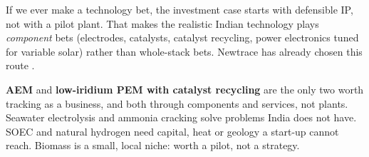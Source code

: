 \begin{finding}
If we ever make a technology bet, the investment case starts with defensible IP, not with a pilot plant. That makes the realistic Indian technology plays \emph{component} bets (electrodes, catalysts, catalyst recycling, power electronics tuned for variable solar) rather than whole-stack bets. Newtrace has already chosen this route \cite{newtrace2026}. \confM
\end{finding}

\begin{verdict}
\textbf{AEM} and \textbf{low-iridium PEM with catalyst recycling} are the only two worth tracking as a business, and both through components and services, not plants. Seawater electrolysis and ammonia cracking solve problems India does not have. SOEC and natural hydrogen need capital, heat or geology a start-up cannot reach. Biomass is a small, local niche: worth a pilot, not a strategy. \confM
\end{verdict}
